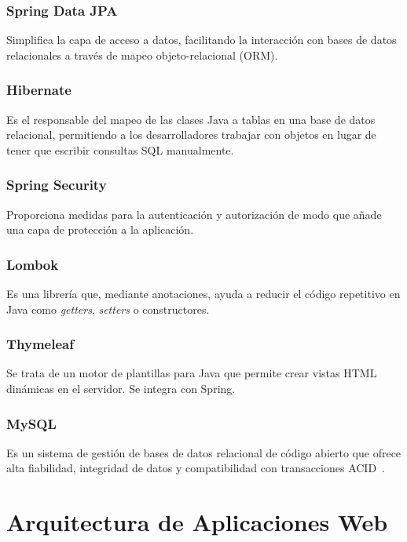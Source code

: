 \subsubsection{Spring Data JPA~\cite{spring-data-jpa}}
Simplifica la capa de acceso a datos, facilitando la interacción con bases de datos relacionales a través de mapeo objeto-relacional (ORM).

\subsubsection{Hibernate~\cite{hibernate}}
Es el responsable del mapeo de las clases Java a tablas en una base de datos relacional, permitiendo a los desarrolladores trabajar con objetos en lugar de tener que escribir consultas SQL manualmente.

\subsubsection{Spring Security~\cite{spring-security}}
Proporciona medidas para la autenticación y autorización de modo que añade una capa de protección a la aplicación.

\subsubsection{Lombok~\cite{lombok}}
Es una librería que, mediante anotaciones, ayuda a reducir el código repetitivo en Java como \emph{getters}, \emph{setters} o constructores.

\subsubsection{Thymeleaf~\cite{thymeleaf}}
Se trata de un motor de plantillas para Java que permite crear vistas HTML dinámicas en el servidor. Se integra con Spring.

\subsubsection{MySQL~\cite{mysql}}
Es un sistema de gestión de bases de datos relacional de código abierto que ofrece alta fiabilidad, integridad de datos y compatibilidad con transacciones ACID~\cite{acid}.

\section{Arquitectura de Aplicaciones Web}

